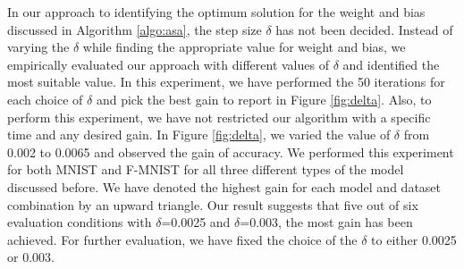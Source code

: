 In our approach to identifying the optimum solution for the weight and bias discussed in Algorithm \ref{algo:asa}, the step size $\delta$ has not been decided. Instead of varying the $\delta$ while finding the appropriate value for weight and bias, we empirically evaluated our approach with different values of $\delta$ and identified the most suitable value. In this experiment, we have performed the 50 iterations for each choice of $\delta$ and pick the best gain to report in Figure \ref{fig:delta}. Also, to perform this experiment, we have not restricted our algorithm with a specific time and any desired gain. In Figure \ref{fig:delta}, we varied the value of $\delta$ from 0.002 to 0.0065 and observed the gain of accuracy. We performed this experiment for both MNIST and F-MNIST for all three different types of the model discussed before. We have denoted the highest gain for each model and dataset combination by an upward triangle. Our result suggests that five out of six evaluation conditions with $\delta$=0.0025 and $\delta$=0.003, the most gain has been achieved. For further evaluation, we have fixed the choice of the $\delta$ to either 0.0025 or 0.003.
